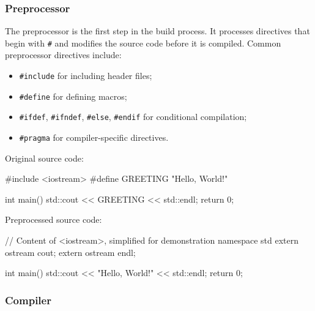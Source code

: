 \subsubsection{Preprocessor}

    The preprocessor is the first step in the build process. It processes directives that begin with \texttt{\#} and modifies the source code before it is compiled.
    Common preprocessor directives include:
    
    \begin{itemize}
        \item \texttt{\#include} for including header files;
        \item \texttt{\#define} for defining macros;
        \item \texttt{\#ifdef}, \texttt{\#ifndef}, \texttt{\#else}, \texttt{\#endif} for conditional compilation;
        \item \texttt{\#pragma} for compiler-specific directives.
    \end{itemize}

    \begin{exampleblock}[Preprocessor]
        Original source code:
        
        \begin{codeblock}[language=C++]
    #include <iostream>
    #define GREETING "Hello, World!"
    
    int main() {
        std::cout << GREETING << std::endl;
        return 0;
    }
        \end{codeblock}
        
        Preprocessed source code:
        
        \begin{codeblock}[language=C++]
    // Content of <iostream>, simplified for demonstration
    namespace std {
        extern ostream cout; 
        extern ostream endl;
    }
    
    int main() {
        std::cout << "Hello, World!" << std::endl;
        return 0;
    }
        \end{codeblock}
    \end{exampleblock}    

\subsubsection{Compiler}
    
